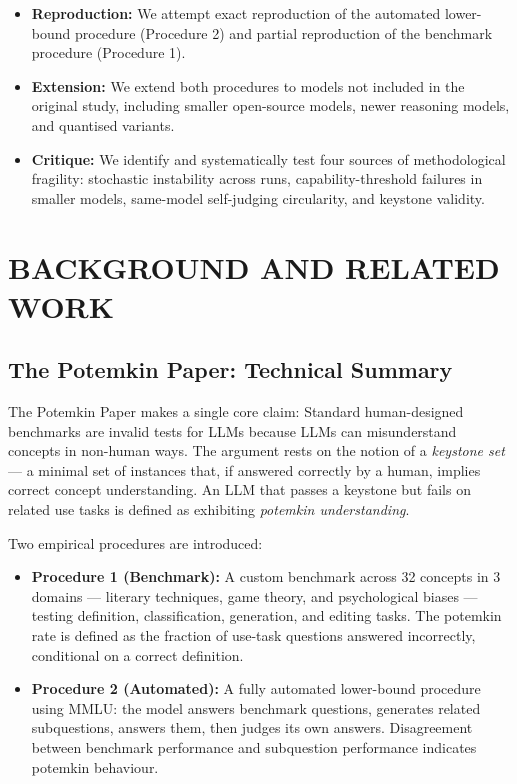 \documentclass[sigconf,authordraft]{acmart}
\begin{document}
\begin{itemize}
    \item \textbf{Reproduction:} We attempt exact reproduction of the automated lower-bound procedure (Procedure 2) and partial reproduction of the benchmark procedure (Procedure 1).
    
    \item \textbf{Extension:} We extend both procedures to models not included in the original study, including smaller open-source models, newer reasoning models, and quantised variants.
    
    \item \textbf{Critique:} We identify and systematically test four sources of methodological fragility: stochastic instability across runs, capability-threshold failures in smaller models, same-model self-judging circularity, and keystone validity.
\end{itemize}

\section{BACKGROUND AND RELATED WORK}

\subsection{The Potemkin Paper: Technical Summary}

The Potemkin Paper \cite{mancoridis2025potemkin} makes a single core claim: Standard human-designed benchmarks are invalid tests for LLMs because LLMs can misunderstand concepts in non-human ways. The argument rests on the notion of a \textit{keystone set} --- a minimal set of instances that, if answered correctly by a human, implies correct concept understanding. An LLM that passes a keystone but fails on related use tasks is defined as exhibiting \textit{potemkin understanding}.

Two empirical procedures are introduced:

\begin{itemize}
    \item \textbf{Procedure 1 (Benchmark):} A custom benchmark across 32 concepts in 3 domains --- literary techniques, game theory, and psychological biases --- testing definition, classification, generation, and editing tasks. The potemkin rate is defined as the fraction of use-task questions answered incorrectly, conditional on a correct definition.
    
    \item \textbf{Procedure 2 (Automated):} A fully automated lower-bound procedure using MMLU: the model answers benchmark questions, generates related subquestions, answers them, then judges its own answers. Disagreement between benchmark performance and subquestion performance indicates potemkin behaviour.
\end{itemize}
\end{document}
